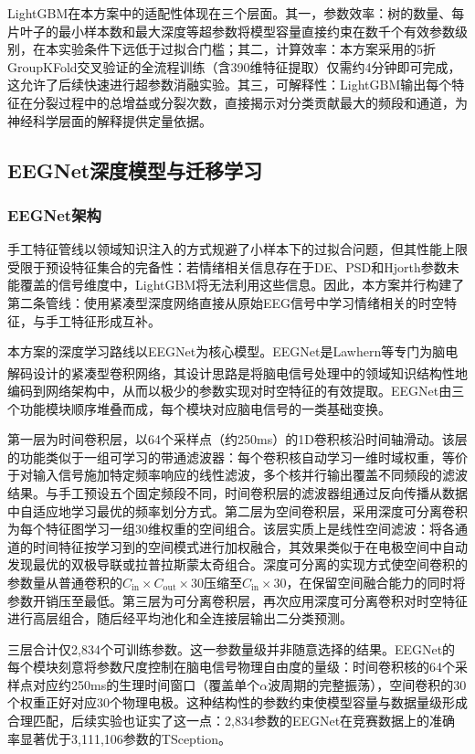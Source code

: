 \documentclass[UTF8,zihao=-4,fontset=windows]{ctexart}
\let\oldcite\cite
\renewcommand{\cite}[1]{\textsuperscript{\oldcite{#1}}}
\numberwithin{equation}{section}
\numberwithin{figure}{section}
\numberwithin{table}{section}
\begin{document}
LightGBM在本方案中的适配性体现在三个层面。其一，参数效率：树的数量、每片叶子的最小样本数和最大深度等超参数将模型容量直接约束在数千个有效参数级别，在本实验条件下远低于过拟合门槛；其二，计算效率：本方案采用的5折GroupKFold交叉验证的全流程训练（含390维特征提取）仅需约4分钟即可完成，这允许了后续快速进行超参数消融实验。其三，可解释性：LightGBM输出每个特征在分裂过程中的总增益或分裂次数，直接揭示对分类贡献最大的频段和通道，为神经科学层面的解释提供定量依据。

\subsection{EEGNet深度模型与迁移学习}

\subsubsection{EEGNet架构}

手工特征管线以领域知识注入的方式规避了小样本下的过拟合问题，但其性能上限受限于预设特征集合的完备性：若情绪相关信息存在于DE、PSD和Hjorth参数未能覆盖的信号维度中，LightGBM将无法利用这些信息。因此，本方案并行构建了第二条管线：使用紧凑型深度网络直接从原始EEG信号中学习情绪相关的时空特征，与手工特征形成互补。

本方案的深度学习路线以EEGNet为核心模型。EEGNet是Lawhern等专门为脑电解码设计的紧凑型卷积网络\cite{eegnet}，其设计思路是将脑电信号处理中的领域知识结构性地编码到网络架构中，从而以极少的参数实现对时空特征的有效提取。EEGNet由三个功能模块顺序堆叠而成，每个模块对应脑电信号的一类基础变换。

第一层为时间卷积层，以64个采样点（约250ms）的1D卷积核沿时间轴滑动。该层的功能类似于一组可学习的带通滤波器：每个卷积核自动学习一维时域权重，等价于对输入信号施加特定频率响应的线性滤波，多个核并行输出覆盖不同频段的滤波结果。与手工预设五个固定频段不同，时间卷积层的滤波器组通过反向传播从数据中自适应地学习最优的频率划分方式。第二层为空间卷积层，采用深度可分离卷积为每个特征图学习一组30维权重的空间组合。该层实质上是线性空间滤波：将各通道的时间特征按学习到的空间模式进行加权融合，其效果类似于在电极空间中自动发现最优的双极导联或拉普拉斯蒙太奇组合。深度可分离的实现方式使空间卷积的参数量从普通卷积的$C_{\text{in}}\times C_{\text{out}}\times 30$压缩至$C_{\text{in}}\times 30$，在保留空间融合能力的同时将参数开销压至最低。第三层为可分离卷积层，再次应用深度可分离卷积对时空特征进行高层组合，随后经平均池化和全连接层输出二分类预测。

三层合计仅2,834个可训练参数。这一参数量级并非随意选择的结果。EEGNet的每个模块刻意将参数尺度控制在脑电信号物理自由度的量级：时间卷积核的64个采样点对应约250ms的生理时间窗口（覆盖单个$\alpha$波周期的完整振荡），空间卷积的30个权重正好对应30个物理电极。这种结构性的参数约束使模型容量与数据量级形成合理匹配，后续实验也证实了这一点：2,834参数的EEGNet在竞赛数据上的准确率显著优于3,111,106参数的TSception。
\end{document}
